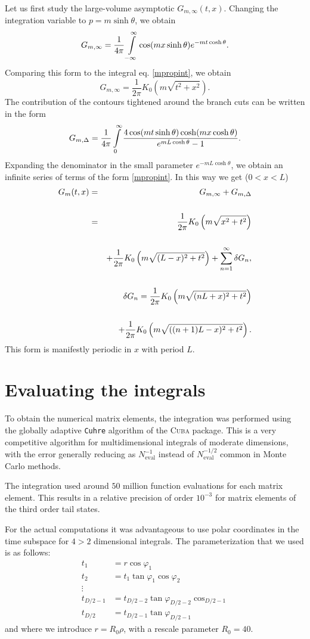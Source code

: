 \documentclass[twocolumn,secnumarabic,amssymb, nobibnotes, aps, prd]{revtex4-2}
\newcommand{\be}{\begin{equation}}
\newcommand{\ee}{\end{equation}}
\begin{document}
Let us first study the large-volume asymptotic $G_{m,\infty}(t,x)$.
Changing the integration variable to $p=m\sinh\theta$, we obtain
\be
G_{m,\infty}=\frac{1}{4\pi}\intop_{-\infty}^{\infty}\cos(mx\sinh\theta)e^{-mt\cosh\theta}.
\ee
Comparing this form to the integral eq. \eqref{mpropint}, we obtain
\be
G_{m,\infty}=\frac{1}{2\pi}K_0\left(m\sqrt{t^2+x^2}\right).
\ee
The contribution of the contours tightened around the branch cuts can be written
in the form
\be
G_{m,\Delta}= \frac{1}{4\pi}\intop_0^{\infty}\frac{4\cos(m t \sinh\theta)\cosh(m x \cosh\theta)}{e^{mL \cosh\theta}-1}.
\ee
Expanding the denominator in the small parameter $e^{-mL\cosh\theta}$, we obtain an
infinite series of terms of the form \eqref{mpropint}. In this way we get ($0<x<L$)
\begin{eqnarray}\label{FVMassivePropApp}
G_{m}(t,x) &=& G_{m,\infty}+G_{m,\Delta}\cr\cr
&=&\frac{1}{2\pi}K_0\left(m\sqrt{x^2+t^2}\right)\cr\cr
&&+\frac{1}{2\pi}K_0\left(m\sqrt{(L-x)^2+t^2}\right)+\sum_{n=1}^{\infty}\delta G_n,\cr\cr
&&\delta G_n=\frac{1}{2\pi}K_0\left(m\sqrt{(nL+x)^2+t^2}\right)\cr\cr 
&&+\frac{1}{2\pi}K_0\left(m\sqrt{((n+1)L-x)^2+t^2}\right).
\end{eqnarray}
This form is manifestly periodic in $x$ with period $L$.

\vskip 10pt

\section{Evaluating the integrals}

To obtain the numerical matrix elements, the integration was performed
using the globally adaptive \texttt{Cuhre} algorithm of the \textsc{Cuba} package.
This is a very competitive algorithm for multidimensional integrals of moderate
dimensions, with the error generally reducing as $N_{\mathrm{eval}}^{-1}$
instead of $N_{\mathrm{eval}}^{-1/2}$ common in Monte Carlo methods.

The integration used around $50$ million function
evaluations for each matrix element. This results in a relative precision of order
$10^{-3}$ for matrix elements of the third order tail states.

For the actual computations it was advantageous to use polar
coordinates in the time subspace for $4>2$ dimensional integrals. The parameterization that we used
is as follows:
\begin{align*}
t_{1} & =r\cos\varphi_{1}\\
t_{2} & =t_{1}\tan\varphi_{1}\cos\varphi_{2}\\
\vdots\\
t_{D/2-1} & =t_{D/2-2}\tan\varphi_{D/2-2}\cos_{D/2-1}\\
t_{D/2} & =t_{D/2-1}\tan\varphi_{D/2-1}
\end{align*}
and where we introduce $r=R_0 \rho$, with a rescale parameter $R_0=40$.
\end{document}
